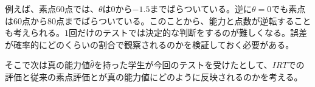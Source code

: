\documentclass[12pt]{jarticle}
\begin{document}
例えば、素点$60$点では、$\theta$は$0$から$-1.5$までばらついている。逆に$\theta = 0$でも素点は$60$点から$80$点までばらついている。このことから、能力と点数が逆転することも考えられる。$1$回だけのテストでは決定的な判断をするのが難しくなる。誤差が確率的にどのくらいの割合で観察されるのかを検証しておく必要がある。

そこで次は真の能力値$\hat{\theta}$を持った学生が今回のテストを受けたとして、$IRT$での評価と従来の素点評価とが真の能力値にどのように反映されるのかを考える。
\end{document}
